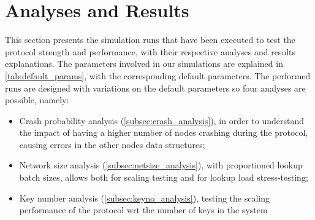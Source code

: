 \documentclass[11pt,twocolumn,letterpaper]{article}
\begin{document}
	\section{Analyses and Results}
	\label{sec:analyses}
	This section presents the simulation runs that have been executed to test the protocol strength and performance, with their respective analyses and results explanations. The parameters involved in our simulations are explained in \cref{tab:default_params}, with the corresponding default parameters. The performed runs are designed with variations on the default parameters so four analyses are possible, namely:
	\begin{itemize}
		\item Crash probability analysis (\cref{subsec:crash_analysis}), in order to understand the impact of having a higher number of nodes crashing during the protocol, causing errors in the other nodes data structures;
		\item Network size analysis (\cref{subsec:netsize_analysis}), with proportioned lookup batch sizes, allows both for scaling testing and for lookup load stress-testing;
		\item Key number analysis (\cref{subsec:keyno_analysis}), testing the scaling performance of the protocol wrt the number of keys in the system
	\end{itemize}
	
\end{document}
